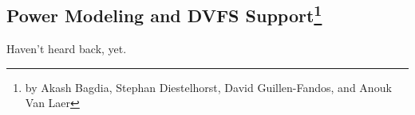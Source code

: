 \subsection[Power Modeling and DVFS Support]{Power Modeling and DVFS Support\footnote{by Akash Bagdia, Stephan Diestelhorst, David Guillen-Fandos, and Anouk Van Laer}}

Haven't heard back, yet.

